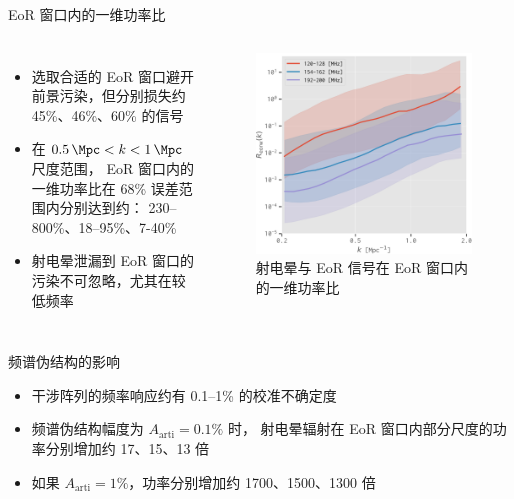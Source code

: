 \documentclass{beamer}
\newcommand{\R}[1]{\text{#1}}  %
\begin{document}
\begin{frame}{EoR 窗口内的一维功率比}
  \begin{columns}
    \begin{itemize}
      \item 选取合适的 EoR 窗口避开前景污染，但分别损失约 45\%、46\%、60\% 的信号
      \item 在 $\SI{0.5}{\per\Mpc} < k < \SI{1}{\per\Mpc}$ 尺度范围，
        EoR 窗口内的一维功率比在 68\% 误差范围内分别达到约：
        230--800\%、18--95\%、7-40\%
      \item 射电晕泄漏到 EoR 窗口的污染不可忽略，尤其在较低频率
    \end{itemize}

    \begin{figure}
      \centering
      \includegraphics[width=\columnwidth]{ps1d-ratio-3bands}
      \caption{射电晕与 EoR 信号在 EoR 窗口内的一维功率比}
    \end{figure}
  \end{columns}
\end{frame}

\begin{frame}{频谱伪结构的影响}
  \begin{itemize}
    \item 干涉阵列的频率响应约有 0.1--1\% 的校准不确定度
    \item 频谱伪结构幅度为 $A_{\R{arti}} = 0.1\%$ 时，
      射电晕辐射在 EoR 窗口内部分尺度的功率分别增加约 17、15、13 倍
    \item 如果 $A_{\R{arti}} = 1\%$，功率分别增加约 1700、1500、1300 倍
  \end{itemize}

  \vspace{-1ex}
\end{frame}
\end{document}
